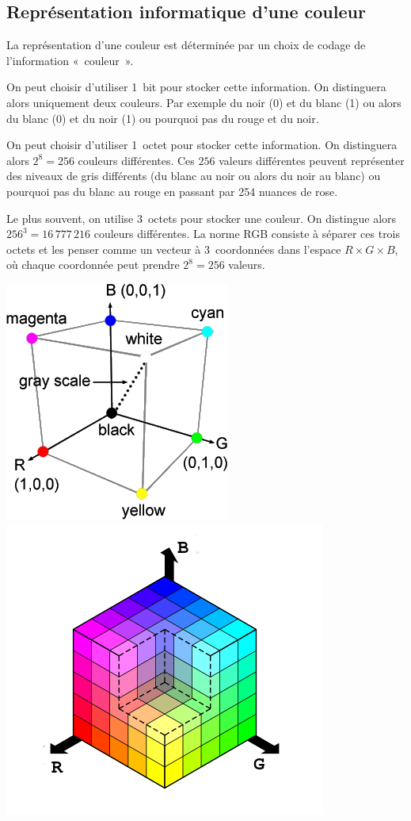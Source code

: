 \documentclass[10pt,fleqn]{article} %
\begin{document}

\vspace{4cm}
\pagestyle{fancy}
\thispagestyle{plain}


\def\columnseprulecolor{\color{ocre}}
\setlength{\columnseprule}{0.4pt} 
\ifprof
\else
\begin{multicols}{2}
\fi

\subsection*{Représentation informatique d'une couleur}
\ifprof
\else
La représentation d'une couleur est déterminée par un choix de codage de l'information
«~couleur~».

On peut choisir d'utiliser 1~bit pour stocker cette
information. On distinguera alors uniquement deux couleurs. Par
exemple du noir (0) et du blanc (1) ou alors du blanc (0) et du noir
(1) ou pourquoi pas du rouge et du noir. 

On peut choisir d'utiliser 1~octet pour stocker cette information. On
distinguera alors $2^8=256$ couleurs différentes. Ces $256$ valeurs
différentes peuvent représenter des niveaux de gris différents (du
blanc au noir ou alors du noir au blanc) ou pourquoi pas du blanc au
rouge en passant par 254 nuances de rose.

Le plus souvent, on utilise 3~octets pour stocker une couleur. On distingue
alors $256^3 = 16\,777\,216$ couleurs différentes. La norme RGB consiste à
séparer ces trois octets et les penser comme
 un vecteur à 3~coordonnées dans l'espace
$R\times G \times B$, où chaque coordonnée peut prendre $2^8=256$
valeurs. 

\begin{center}
  \includegraphics[width=.2\textwidth]{images/theme_image_1_fig_1}
  \includegraphics[width=.2\textwidth]{images/theme_image_1_fig_2}
\end{center}


\end{multicols}
\end{document}
